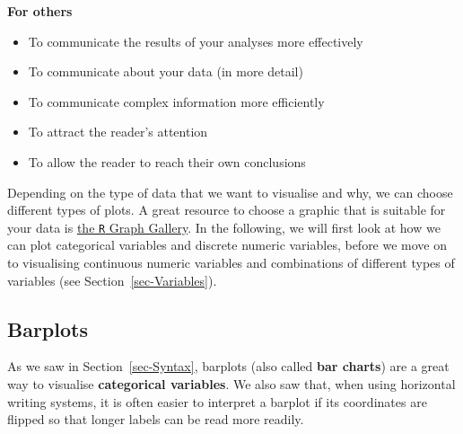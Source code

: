 \documentclass[
  letterpaper,
  DIV=11,
  numbers=noendperiod]{scrreprt}
\providecommand{\tightlist}{%
  \setlength{\itemsep}{0pt}\setlength{\parskip}{0pt}}
\begin{document}
\textbf{For others}

\begin{itemize}
\tightlist
\item
  To communicate the results of your analyses more effectively
\item
  To communicate about your data (in more detail)
\item
  To communicate complex information more efficiently
\item
  To attract the reader's attention
\item
  To allow the reader to reach their own conclusions
\end{itemize}

Depending on the type of data that we want to visualise and why, we can
choose different types of plots. A great resource to choose a graphic
that is suitable for your data is
\href{https://r-graph-gallery.com/}{the \texttt{R} Graph Gallery}. In
the following, we will first look at how we can plot categorical
variables and discrete numeric variables, before we move on to
visualising continuous numeric variables and combinations of different
types of variables (see Section~\ref{sec-Variables}).

\subsection{Barplots}\label{barplots}

As we saw in Section~\ref{sec-Syntax}, barplots (also called \textbf{bar
charts}) are a great way to visualise \textbf{categorical variables}. We
also saw that, when using horizontal writing systems, it is often easier
to interpret a barplot if its coordinates are flipped so that longer
labels can be read more readily.
\end{document}
